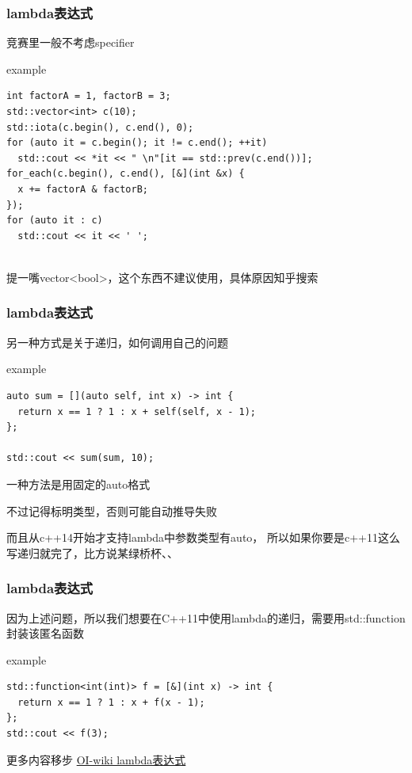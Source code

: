 \documentclass{beamer}
\begin{document}
  \begin{frame}[fragile]
    \frametitle{lambda表达式}
    竞赛里一般不考虑specifier

    \begin{block}{example}
      \begin{lstlisting}
int factorA = 1, factorB = 3;
std::vector<int> c(10);
std::iota(c.begin(), c.end(), 0);
for (auto it = c.begin(); it != c.end(); ++it)
  std::cout << *it << " \n"[it == std::prev(c.end())];
for_each(c.begin(), c.end(), [&](int &x) {
  x += factorA & factorB;
});
for (auto it : c)
  std::cout << it << ' ';
        
      \end{lstlisting}

    \end{block}

    提一嘴vector<bool>，这个东西不建议使用，具体原因知乎搜索
  \end{frame}

  \begin{frame}[fragile]
    \frametitle{lambda表达式}
    另一种方式是关于递归，如何调用自己的问题
    \begin{block}{example}
      \begin{lstlisting}
auto sum = [](auto self, int x) -> int {
  return x == 1 ? 1 : x + self(self, x - 1);
};

std::cout << sum(sum, 10);
      \end{lstlisting}

    \end{block}

    一种方法是用固定的auto格式
    
    不过记得标明类型，否则可能自动推导失败

    \vspace*{1\baselineskip}

    而且从c++14开始才支持lambda中参数类型有auto，
    所以如果你要是c++11这么写递归就完了，比方说某绿桥杯、、
  \end{frame}


  \begin{frame}[fragile]
    \frametitle{lambda表达式}

    因为上述问题，所以我们想要在C++11中使用lambda的递归，需要用std::function封装该匿名函数

    \begin{block}{example}
      \begin{lstlisting}
std::function<int(int)> f = [&](int x) -> int {
  return x == 1 ? 1 : x + f(x - 1);
};
std::cout << f(3);
      \end{lstlisting}      
    \end{block}
    \pause
  
    更多内容移步 \href{https://oi-wiki.org/lang/lambda}{OI-wiki lambda表达式}
  \end{frame}
\end{document}
